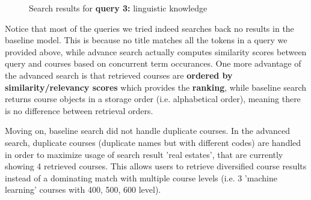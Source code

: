 \documentclass[twoside]{article}
\begin{document}
\begin{figure}
    \centering
    \qquad
    \caption{Search results for \textbf{query 3:} linguistic knowledge} %
    \label{fig:comp1}%
\end{figure}

\pagebreak

Notice that most of the queries we tried indeed searches back no results in the baseline model. This is because no title matches all the tokens in a query we provided above, while advance search actually computes similarity scores between query and courses based on concurrent term occurances. One more advantage of the advanced search is that retrieved courses are \textbf{ordered by similarity/relevancy scores} which provides the \textbf{ranking}, while baseline search returns course objects in a storage order (i.e. alphabetical order), meaning there is no difference between retrieval orders.

Moving on, baseline search did not handle duplicate courses. In the advanced search, duplicate courses (duplicate names but with different codes) are handled in order to maximize usage of search result 'real estates', that are currently showing 4 retrieved courses. This allows users to retrieve diversified course results instead of a dominating match with multiple course levels (i.e. 3 'machine learning' courses with 400, 500, 600 level).
\end{document}
